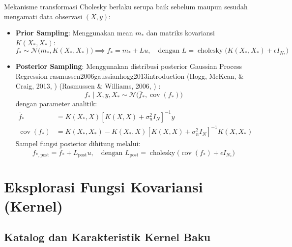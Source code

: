\documentclass[11pt,a4paper]{article}
\def\mathbf#1{#1}%
\newcommand{\citep}[2][]{%
  \def\key{#2}%
  \def\hoggkey{hogg2013introduction}%
  \ifx\key\hoggkey
    (Hogg, McKean, \& Craig, 2013\if\relax\detokenize{#1}\relax\else, #1\fi)%
  \else
    (Rasmussen \& Williams, 2006\if\relax\detokenize{#1}\relax\else, #1\fi)%
  \fi
}
\begin{document}
Mekanisme transformasi Cholesky berlaku serupa baik sebelum maupun sesudah mengamati data observasi $(X, \mathbf{y})$:
\begin{itemize}
    \item \textbf{Prior Sampling}: Menggunakan mean $\mathbf{m}_*$ dan matriks kovariansi $K(X_*, X_*)$:
    \begin{equation}
    \mathbf{f}_* \sim \mathcal{N}\big(\mathbf{\mathbf{m}_*}, K(X_*, X_*)\big) \implies \mathbf{f}_* = \mathbf{m}_* + L \mathbf{u}, \quad \text{dengan } L = \operatorname{cholesky}\big(K(X_*, X_*) + \epsilon I_{N_*}\big)
    \end{equation}
    \item \textbf{Posterior Sampling}: Menggunakan distribusi posterior Gaussian Process Regression \citep{rasmussen2006gaussian}:
    \begin{equation}
    \mathbf{f}_* \mid X, \mathbf{y}, X_* \sim \mathcal{N}\big( \bar{\mathbf{f}}_*, \operatorname{cov}(\mathbf{f}_*) \big)
    \end{equation}
    dengan parameter analitik:
    \begin{align}
    \bar{\mathbf{f}}_* &= K(X_*, X) \left[ K(X, X) + \sigma_n^2 I_N \right]^{-1} \mathbf{y} \\
    \operatorname{cov}(\mathbf{f}_*) &= K(X_*, X_*) - K(X_*, X) \left[ K(X, X) + \sigma_n^2 I_N \right]^{-1} K(X, X_*)
    \end{align}
    Sampel fungsi posterior dihitung melalui:
    \begin{equation}
    \mathbf{f}_{*,\text{post}} = \bar{\mathbf{f}}_* + L_{\text{post}} \mathbf{u}, \quad \text{dengan } L_{\text{post}} = \operatorname{cholesky}\big(\operatorname{cov}(\mathbf{f}_*) + \epsilon I_{N_*}\big)
    \end{equation}
\end{itemize}

\section{Eksplorasi Fungsi Kovariansi (Kernel)}
\label{sec:eksplorasi_kernel}

\subsection{Katalog dan Karakteristik Kernel Baku}
\end{document}
